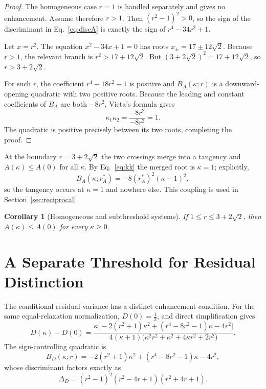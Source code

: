 \documentclass[11pt]{article}
\theoremstyle{plain}
\newtheorem{corollary}{Corollary}
\theoremstyle{remark}
\newcommand{\rA}{r_A^{*}}
\begin{document}
\begin{proof}
The homogeneous case $r=1$ is handled separately and gives no enhancement. Assume therefore
$r>1$. Then $(r^2-1)^2>0$, so the sign of the discriminant in Eq.~\eqref{eq:discA} is exactly
the sign of $r^4-34r^2+1$.

Let $x=r^2$. The equation $x^2-34x+1=0$ has roots $x_{\pm}=17\pm12\sqrt2$. Because $r>1$, the
relevant branch is $r^2>17+12\sqrt2$. But $(3+2\sqrt2)^2=17+12\sqrt2$, so $r>3+2\sqrt2$.

For such $r$, the coefficient $r^4-18r^2+1$ is positive and $B_A(\kappa;r)$ is a
downward-opening quadratic with two positive roots. Because the leading and constant
coefficients of $B_A$ are both $-8r^2$, Vieta's formula gives
\[
  \kappa_1\kappa_2=\frac{-8r^2}{-8r^2}=1 .
\]
The quadratic is positive precisely between its two roots, completing the proof.
\end{proof}

At the boundary $r=3+2\sqrt2$ the two crossings merge into a tangency and $A(\kappa)\le A(0)$
for all $\kappa$. By Eq.~\eqref{eq:kk} the merged root is $\kappa=1$; explicitly,
\begin{equation}
  B_A(\kappa;\rA)=-8(\rA)^2(\kappa-1)^2 , \label{eq:tangency}
\end{equation}
so the tangency occurs at $\kappa=1$ and nowhere else. This coupling is used in
Section~\ref{sec:reciprocal}.

\begin{corollary}[Homogeneous and subthreshold systems]\label{cor:sub}
If $1\le r\le3+2\sqrt2$, then $A(\kappa)\le A(0)$ for every $\kappa\ge0$.
\end{corollary}

\section{A Separate Threshold for Residual Distinction}\label{sec:residual}

The conditional residual variance has a distinct enhancement condition. For the same
equal-relaxation normalization, $D(0)=\tfrac12$, and direct simplification gives
\begin{equation}
  D(\kappa)-D(0)
  =\frac{\kappa\bigl[-2(r^2+1)\kappa^2+(r^4-8r^2-1)\kappa-4r^2\bigr]}
        {4(\kappa+1)\bigl(\kappa^2r^2+\kappa^2+4\kappa r^2+2r^2\bigr)} . \label{eq:Ddiff}
\end{equation}
The sign-controlling quadratic is
\begin{equation}
  B_D(\kappa;r)=-2(r^2+1)\kappa^2+(r^4-8r^2-1)\kappa-4r^2, \label{eq:BD}
\end{equation}
whose discriminant factors exactly as
\begin{equation}
  \Delta_D=(r^2-1)^2(r^2-4r+1)(r^2+4r+1). \label{eq:discD}
\end{equation}
\end{document}

